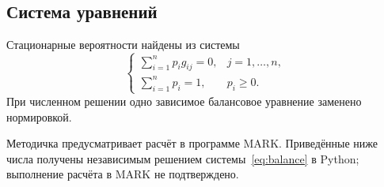 \documentclass[12pt,a4paper]{article}
\begin{document}
\subsection{Система уравнений}
Стационарные вероятности найдены из системы
\begin{equation}
\begin{cases}
\displaystyle\sum_{i=1}^{n}p_i g_{ij}=0,& j=1,\ldots,n,\\[2mm]
\displaystyle\sum_{i=1}^{n}p_i=1,&p_i\geq0.
\end{cases}\label{eq:balance}
\end{equation}
При численном решении одно зависимое балансовое уравнение заменено нормировкой.

Методичка предусматривает расчёт в программе MARK. Приведённые ниже числа получены независимым решением системы~\eqref{eq:balance} в Python; выполнение расчёта в MARK не подтверждено.
\newpage
\end{document}
